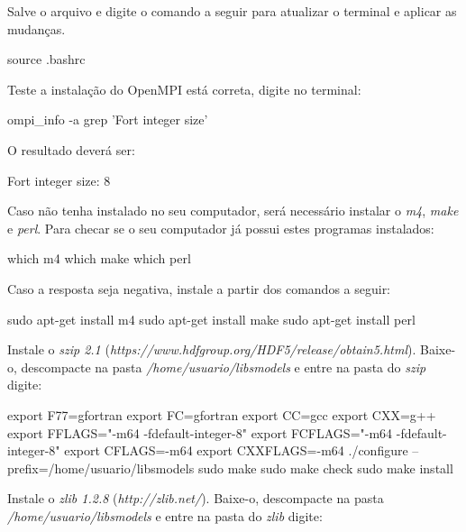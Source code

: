 \noindent Salve o arquivo e digite o comando a seguir para atualizar o terminal e aplicar as mudanças.
\bigskip

\begin{bashcode}
source .bashrc
\end{bashcode}
\bigskip

\noindent Teste a instalação do OpenMPI está correta, digite no terminal:
\bigskip

\begin{bashcode}
ompi_info -a grep 'Fort integer size'
\end{bashcode}
\bigskip

\noindent O resultado deverá ser:
\bigskip

\begin{bashcode}
Fort integer size: 8
\end{bashcode}
\bigskip

\noindent Caso não tenha instalado no seu computador, será necessário instalar o \textit{m4}, \textit{make} e \textit{perl}. Para checar se o seu computador já possui estes programas instalados:
\bigskip

\begin{bashcode}
which m4
which make
which perl
\end{bashcode}
\bigskip

\noindent Caso a resposta seja negativa, instale a partir dos comandos a seguir:
\bigskip

\begin{bashcode}
sudo apt-get install m4
sudo apt-get install make
sudo apt-get install perl
\end{bashcode}
\bigskip

\noindent Instale o \textit{szip 2.1} (\textcolor{bleu_cite}{\textit{https://www.hdfgroup.org/HDF5/release/obtain5.html}}). Baixe-o, descompacte na pasta \textit{/home/usuario/libsmodels} e entre na pasta do \textit{szip} digite:
\bigskip

\begin{bashcode}
export F77=gfortran
export FC=gfortran
export CC=gcc
export CXX=g++
export FFLAGS="-m64 -fdefault-integer-8"
export FCFLAGS="-m64 -fdefault-integer-8"
export CFLAGS=-m64
export CXXFLAGS=-m64
./configure --prefix=/home/usuario/libsmodels
sudo make
sudo make check
sudo make install
\end{bashcode}
\bigskip

\noindent Instale o \textit{zlib 1.2.8} (\textcolor{bleu_cite}{\textit{http://zlib.net/}}). Baixe-o, descompacte na pasta \textit{/home/usuario/libsmodels} e entre na pasta do \textit{zlib} digite:
\bigskip

